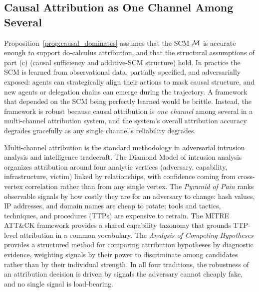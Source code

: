 \subsection{Causal Attribution as One Channel Among Several}
\label{sec:multi_channel}

Proposition~\ref{prop:causal_dominates} assumes that the SCM $\mathcal{M}$ is
accurate enough to support do-calculus attribution, and that the
structural assumptions of part (c) (causal sufficiency and
additive-SCM structure) hold. In practice the SCM is learned from
observational data, partially specified, and adversarially exposed:
agents can strategically align their actions to mask causal
structure, and new agents or delegation chains can emerge during the
trajectory. A framework that depended on the SCM being perfectly
learned would be brittle. Instead, the framework is robust because
causal attribution is \emph{one channel} among several in a
multi-channel attribution system, and the system's overall
attribution accuracy degrades gracefully as any single channel's
reliability degrades.

Multi-channel attribution is the standard methodology in adversarial
intrusion analysis and intelligence tradecraft. The Diamond Model of
intrusion analysis \citep{caltagirone2013diamond} organizes attribution
around four analytic vertices (adversary, capability,
infrastructure, victim) linked by relationships, with confidence
coming from cross-vertex correlation rather than from any single
vertex. The \emph{Pyramid of Pain} \citep{bianco2013pyramid} ranks
observable signals by how costly they are for an adversary to change:
hash values, IP addresses, and domain names are cheap to rotate;
tools and tactics, techniques, and procedures (TTPs) are expensive to
retrain. The MITRE ATT\&CK framework \citep{strom2018attack} provides
a shared capability taxonomy that grounds TTP-level attribution in a
common vocabulary. The \emph{Analysis of Competing Hypotheses}
\citep{heuer1999psychology} provides a structured method for
comparing attribution hypotheses by diagnostic evidence, weighting
signals by their power to discriminate among candidates rather than
by their individual strength. In all four traditions, the robustness
of an attribution decision is driven by signals the adversary cannot
cheaply fake, and no single signal is load-bearing.

